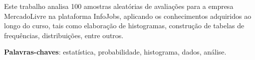 	
	\imprimircapa
	\imprimirfolhaderosto
	\begin{resumo}		
	   Este trabalho analisa 100 amostras aleatórias de avaliações para a empresa MercadoLivre na plataforma InfoJobs, aplicando os conhecimentos adquiridos ao longo do curso, tais como elaboração de histogramas, construção de tabelas de frequências, distribuições, entre outros.
	
	   \vspace{\onelineskip}
	   \noindent
	   \textbf{Palavras-chaves}: estatística, probabilidade, histograma, dados, análise.
	\end{resumo}
	
	
	
